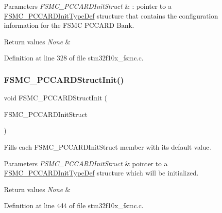 \begin{DoxyParams}{Parameters}
{\em F\+S\+M\+C\+\_\+\+P\+C\+C\+A\+R\+D\+Init\+Struct} & \+: pointer to a \hyperlink{struct_f_s_m_c___p_c_c_a_r_d_init_type_def}{F\+S\+M\+C\+\_\+\+P\+C\+C\+A\+R\+D\+Init\+Type\+Def} structure that contains the configuration information for the F\+S\+MC P\+C\+C\+A\+RD Bank. \\
\hline
\end{DoxyParams}

\begin{DoxyRetVals}{Return values}
{\em None} & \\
\hline
\end{DoxyRetVals}


Definition at line 328 of file stm32f10x\+\_\+fsmc.\+c.

\mbox{\label{group___f_s_m_c___exported___functions_ga7a64ba0e0545b3f1913c9d1d28c05e62}} 
\subsubsection{\texorpdfstring{F\+S\+M\+C\+\_\+\+P\+C\+C\+A\+R\+D\+Struct\+Init()}{FSMC\_PCCARDStructInit()}}
{\footnotesize\ttfamily void F\+S\+M\+C\+\_\+\+P\+C\+C\+A\+R\+D\+Struct\+Init (\begin{DoxyParamCaption}\item[{\hyperlink{struct_f_s_m_c___p_c_c_a_r_d_init_type_def}{F\+S\+M\+C\+\_\+\+P\+C\+C\+A\+R\+D\+Init\+Type\+Def} $\ast$}]{F\+S\+M\+C\+\_\+\+P\+C\+C\+A\+R\+D\+Init\+Struct }\end{DoxyParamCaption})}



Fills each F\+S\+M\+C\+\_\+\+P\+C\+C\+A\+R\+D\+Init\+Struct member with its default value. 


\begin{DoxyParams}{Parameters}
{\em F\+S\+M\+C\+\_\+\+P\+C\+C\+A\+R\+D\+Init\+Struct} & pointer to a \hyperlink{struct_f_s_m_c___p_c_c_a_r_d_init_type_def}{F\+S\+M\+C\+\_\+\+P\+C\+C\+A\+R\+D\+Init\+Type\+Def} structure which will be initialized. \\
\hline
\end{DoxyParams}

\begin{DoxyRetVals}{Return values}
{\em None} & \\
\hline
\end{DoxyRetVals}


Definition at line 444 of file stm32f10x\+\_\+fsmc.\+c.

